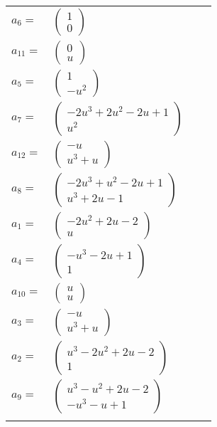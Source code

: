 \documentclass[1p]{elsarticle_modified}
\theoremstyle{definition}
\begin{document}
\begin{tabular}{m{7pt} m{180pt} m{7pt} m{180pt} }
\flushright $a_{6}=$&$\begin{pmatrix}1\\0\end{pmatrix}$ \\
\flushright $a_{11}=$&$\begin{pmatrix}0\\u\end{pmatrix}$ \\
\flushright $a_{5}=$&$\begin{pmatrix}1\\- u^2\end{pmatrix}$ \\
\flushright $a_{7}=$&$\begin{pmatrix}-2 u^3+2 u^2-2 u+1\\u^2\end{pmatrix}$ \\
\flushright $a_{12}=$&$\begin{pmatrix}- u\\u^3+u\end{pmatrix}$ \\
\flushright $a_{8}=$&$\begin{pmatrix}-2 u^3+u^2-2 u+1\\u^3+2 u-1\end{pmatrix}$ \\
\flushright $a_{1}=$&$\begin{pmatrix}-2 u^2+2 u-2\\u\end{pmatrix}$ \\
\flushright $a_{4}=$&$\begin{pmatrix}- u^3-2 u+1\\1\end{pmatrix}$ \\
\flushright $a_{10}=$&$\begin{pmatrix}u\\u\end{pmatrix}$ \\
\flushright $a_{3}=$&$\begin{pmatrix}- u\\u^3+u\end{pmatrix}$ \\
\flushright $a_{2}=$&$\begin{pmatrix}u^3-2 u^2+2 u-2\\1\end{pmatrix}$ \\
\flushright $a_{9}=$&$\begin{pmatrix}u^3- u^2+2 u-2\\- u^3- u+1\end{pmatrix}$\\&\end{tabular}
\end{document}
